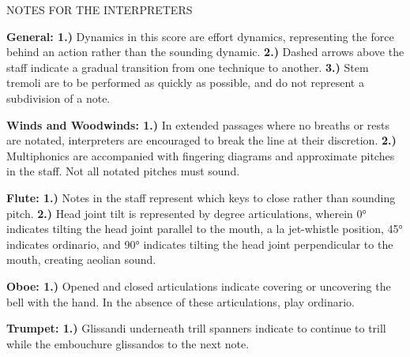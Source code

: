 \documentclass[11pt]{article}
\begin{document}
\vspace*{4\baselineskip}

\begingroup
\begin{center}
\huge NOTES FOR THE INTERPRETERS
\end{center}
\endgroup

\begingroup
\begin{center}
\textbf{General: 1.)} Dynamics in this score are effort dynamics, representing the force behind an action rather than the sounding dynamic. \textbf{2.)} Dashed arrows above the staff indicate a gradual transition from one technique to another. \textbf{3.)}  Stem tremoli are to be performed as quickly as possible, and do not represent a subdivision of a note. \\
\rightskip\leftskip
\end{center}
\endgroup

\begingroup
\begin{center}
\textbf{Winds and Woodwinds: 1.)} In extended passages where no breaths or rests are notated, interpreters are encouraged to break the line at their discretion. \textbf{2.)} Multiphonics are accompanied with fingering diagrams and approximate pitches in the staff. Not all notated pitches must sound. \\
\rightskip\leftskip
\end{center}
\endgroup

\begingroup
\begin{center}
\textbf{Flute: 1.)} Notes in the staff represent which keys to close rather than sounding pitch. \textbf{2.)} Head joint tilt is represented by degree articulations, wherein 0° indicates tilting the head joint parallel to the mouth, a la jet-whistle position, 45° indicates ordinario, and 90° indicates tilting the head joint perpendicular to the mouth, creating aeolian sound. \\ 
\rightskip\leftskip
\end{center}
\endgroup

\begingroup
\begin{center}
\textbf{Oboe: 1.)} Opened and closed articulations indicate covering or uncovering the bell with the hand. In the absence of these articulations, play ordinario. \\
\rightskip\leftskip
\end{center}
\endgroup

\begingroup
\begin{center}
\textbf{Trumpet: 1.)} Glissandi underneath trill spanners indicate to continue to trill while the embouchure glissandos to the next note. \\
\rightskip\leftskip
\end{center}
\endgroup
\end{document}
